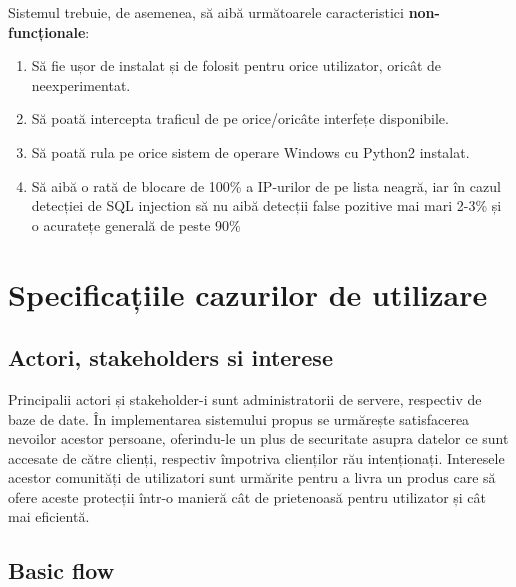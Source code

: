 Sistemul trebuie, de asemenea, să aibă următoarele caracteristici \textbf{non-funcționale}:
\begin{enumerate}
	\item Să fie ușor de instalat și de folosit pentru orice utilizator, oricât de neexperimentat. 
	\item Să poată intercepta traficul de pe orice/oricâte interfețe disponibile. 
	\item Să poată rula pe orice sistem de operare Windows cu Python2 instalat. 
	\item Să aibă o rată de blocare de 100\% a IP-urilor de pe lista neagră, iar 
	în cazul detecției de SQL injection să nu aibă detecții false pozitive mai mari 2-3\% 
	și o acuratețe generală de peste 90\% 
\end{enumerate}
\newpage

\section{Specificațiile cazurilor de utilizare}

\subsection{Actori, stakeholders si interese}

Principalii actori și stakeholder-i sunt administratorii de servere, respectiv de baze de date. În implementarea sistemului propus se urmărește satisfacerea nevoilor acestor persoane, oferindu-le un plus de securitate asupra datelor ce sunt accesate de către clienți, respectiv împotriva clienților rău intenționați. Interesele acestor comunități de utilizatori sunt urmărite pentru a livra un produs care să ofere aceste protecții într-o manieră cât de prietenoasă pentru utilizator și cât mai eficientă. 

\subsection{Basic flow}

